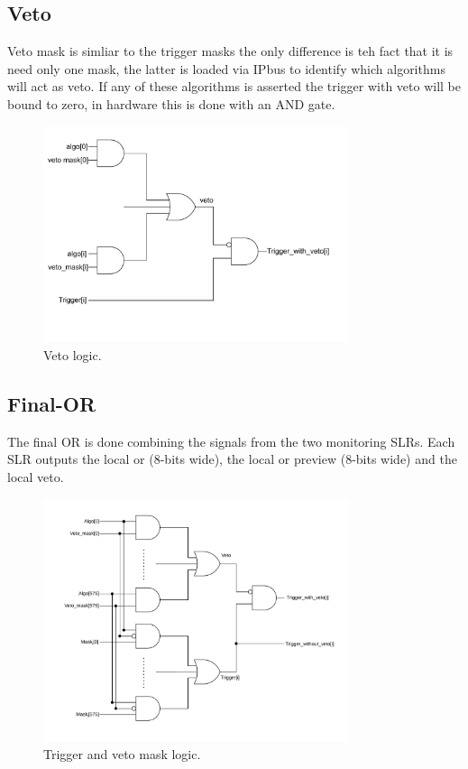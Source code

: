 \documentclass[a4paper,11pt]{article}
\begin{document}
\subsection{Veto}

Veto mask is simliar to the trigger masks the only difference is teh fact that it is need only one mask, the latter is loaded via IPbus to identify which algorithms will act as veto. If any of these algorithms is asserted the trigger with veto will be bound to zero, in hardware this is done with an AND gate.

\begin{figure}[h]
    \centering
    \includegraphics[width=0.8\textwidth]{Images/Modules/Veto.pdf}
    \caption{Veto logic.}
    \label{fig:VetoMask}
\end{figure}

\subsection{Final-OR}

The final OR is done combining the signals from the two monitoring SLRs. Each SLR outputs the local or (8-bits wide), the local or preview (8-bits wide) and the local veto.

\begin{figure}[h]
    \centering
    \includegraphics[width=0.8\textwidth]{Images/Modules/Trigger_Veto.pdf}
    \caption{Trigger and veto mask logic.}
    \label{fig:VetoMask}
\end{figure}
\end{document}
